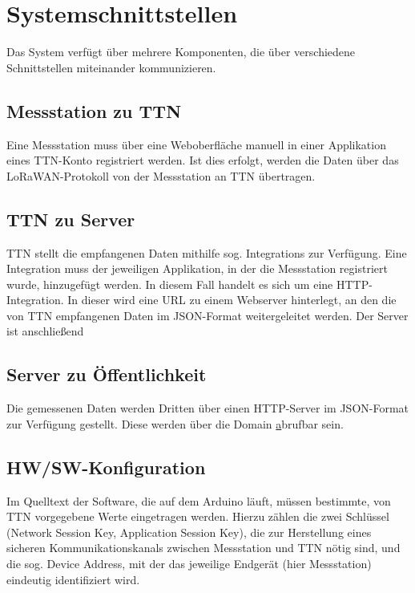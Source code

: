 \section{Systemschnittstellen}

Das System verf\"ugt \"uber mehrere Komponenten, die \"uber verschiedene
Schnittstellen miteinander kommunizieren.

\subsection{Messstation zu TTN}
Eine Messstation muss \"uber eine Weboberfl\"ache manuell in einer Applikation
eines TTN-Konto registriert werden. Ist dies erfolgt, werden die Daten \"uber
das LoRaWAN-Protokoll von der Messstation an TTN \"ubertragen.

\subsection{TTN zu Server}
TTN stellt die empfangenen Daten mithilfe sog. \glqq Integrations\grqq{} zur Verf\"ugung.
Eine \glqq Integration\grqq{} muss der jeweiligen Applikation, in der die Messstation registriert
wurde, hinzugef\"ugt werden.
In diesem Fall handelt es sich um eine \glqq HTTP-Integration\grqq. In dieser wird eine URL zu
einem Webserver hinterlegt, an den die von TTN empfangenen Daten im JSON-Format
weitergeleitet werden. Der Server ist anschlie{\ss}end

\subsection{Server zu \"Offentlichkeit}
Die gemessenen Daten werden Dritten \"uber einen HTTP-Server im JSON-Format zur Verf\"ugung gestellt.
Diese werden \"uber die Domain \href{http://www.berlinerdaten.de/} abrufbar sein.

\subsection{HW/SW-Konfiguration}

Im Quelltext der Software, die auf dem Arduino l\"auft, m\"ussen bestimmte, von TTN vorgegebene
Werte eingetragen werden. Hierzu z\"ahlen die zwei Schl\"ussel (\glqq Network Session Key\grqq,
\glqq Application Session Key\grqq), die zur Herstellung eines sicheren Kommunikationskanals
zwischen Messstation und TTN n\"otig sind, und die sog. \glqq Device Address\grqq, mit der
das jeweilige Endger\"at (hier Messstation) eindeutig identifiziert wird.
